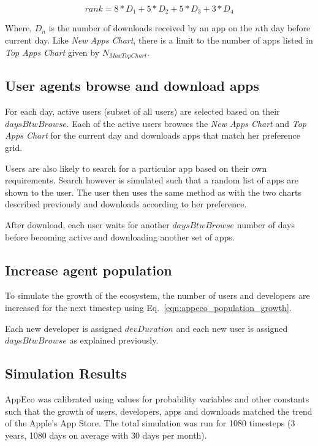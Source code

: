 \begin{equation}\label{eqn:appeco_app_ranking}
rank = 8*D_1 + 5*D_2 + 5*D_3 + 3*D_4
\end{equation}

Where, $D_n$ is the number of downloads received by an app on the $n$th day before current day.
Like \emph{New Apps Chart}, there is a limit to the number of apps listed in \emph{Top Apps Chart} given by $N_{MaxTopChart}$.

\subsection*{User agents browse and download apps}

For each day, active users (subset of all users) are selected based on their $daysBtwBrowse$. Each of the active users browses the \emph{New Apps Chart} and \emph{Top Apps Chart} for the current day and downloads apps that match her preference grid. 

Users are also likely to search for a particular app based on their own requirements. Search however is simulated such that a random list of apps are shown to the user. The user then uses the same method as with the two charts described previously and downloads according to her preference. 

After download, each user waits for another $daysBtwBrowse$ number of days before becoming active and downloading another set of apps.

\subsection*{Increase agent population}

To simulate the growth of the ecosystem, the number of users and developers are increased for the next timestep using Eq.~\ref{eqn:appeco_population_growth}.

Each new developer is assigned $devDuration$ and each new user is assigned $daysBtwBrowse$ as explained previously.

\subsection{Simulation Results}

AppEco was calibrated using values for probability variables and other constants such that the growth of users, developers, apps and downloads matched the trend of the Apple's App Store. The total simulation was run for 1080 timesteps (3 years, 1080 days on average with 30 days per month). 

